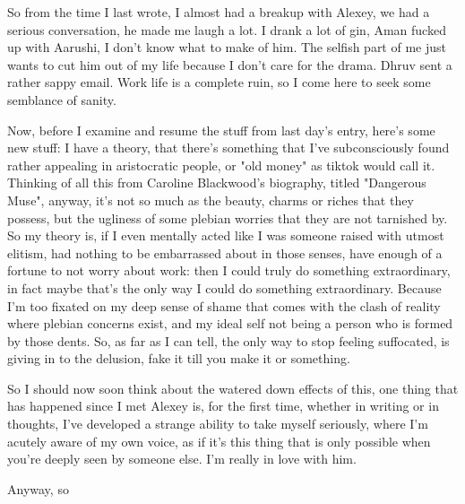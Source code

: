 \noindent {}

So from the time I last wrote, I almost had a breakup with Alexey, we had a serious conversation, he made me laugh a lot. I drank a lot of gin, Aman fucked up with Aarushi, I don't know what to make of him. The selfish part of me just wants to cut him out of my life because I don't care for the drama. Dhruv sent a rather sappy email. Work life is a complete ruin, so I come here to seek some semblance of sanity.

Now, before I examine and resume the stuff from last day's entry, here's some new stuff: I have a theory, that there's something that I've subconsciously found rather appealing in aristocratic people, or "old money" as tiktok would call it. Thinking of all this from Caroline Blackwood's biography, titled "Dangerous Muse", anyway, it's not so much as the beauty, charms or riches that they possess, but the ugliness of some plebian worries that they are not tarnished by. So my theory is, if I even mentally acted like I was someone raised with utmost elitism, had nothing to be embarrassed about in those senses, have enough of a fortune to not worry about work: then I could truly do something extraordinary, in fact maybe that's the only way I could do something extraordinary. Because I'm too fixated on my deep sense of shame that comes with the clash of reality where plebian concerns exist, and my ideal self not being a person who is formed by those dents. So, as far as I can tell, the only way to stop feeling suffocated, is giving in to the delusion, fake it till you make it or something. 

So I should now soon think about the watered down effects of this, one thing that has happened since I met Alexey is, for the first time, whether in writing or in thoughts, I've developed a strange ability to take myself seriously, where I'm acutely aware of my own voice, as if it's this thing that is only possible when you're deeply seen by someone else. I'm really in love with him. 

Anyway, so 